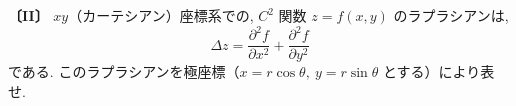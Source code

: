 \noindent\textbf{〔II〕}
$xy$（カーテシアン）座標系での, $C^2$ 関数 $z=f(x,y)$ のラプラシアンは,
\[
\Delta z=\frac{\partial^2 f}{\partial x^2}+\frac{\partial^2 f}{\partial y^2}
\]
である. このラプラシアンを極座標（$x=r\cos\theta,\ y=r\sin\theta$ とする）により表せ.
